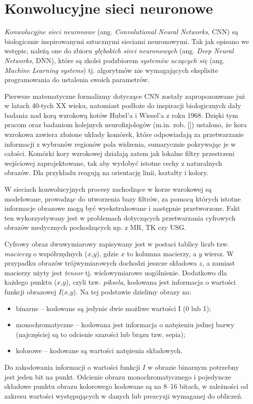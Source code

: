 \chapter{Konwolucyjne sieci neuronowe}
\textit{Konwolucyjne sieci neuronowe} (ang. \textit{Convolutional Neural Networks}, CNN) są biologicznie inspirowanymi sztucznymi sieciami neuronowymi. Tak jak opisano we wstępie, należą one do zbioru \textit{głębokich sieci neuronowych} (ang. \textit{Deep Neural Networks}, DNN), które są zkolei podzbiorem \textit{systemów uczących się} (ang. \textit{Machine Learning systems}) tj. algorytmów nie wymagających eksplisite programowania do ustalenia swoich parametrów.

Pierwsze matematyczne formalizmy dotyczące CNN zostały zapropozonwane już w latach 40-tych XX wieku, natomiast podłoże do inspiracji biologicznych dały badania nad korą wzrokową kotów Hubel'a i Wiesel’a z roku 1968. Dzięki tym pracom oraz badaniom kolejnych neurofizjologów (m.in. zob. []) ustalono, że kora wzrokowa zawiera złożone układy komórek, które odpowiadają za przetwarzanie informacji z wybranów regionów pola widzenia, sumarycznie pokrywając je w całości. Komórki kory wzrokowej działają zatem jak lokalne filtry przestrzeni wejściowej zaprojektowane, tak aby wydobyć istotne cechy z naturalnych obrazów. Dla przykładu reagują na orientację linii, kształty i kolory.

W sieciach konwolucyjnych procesy zachodzące w korze wzrokowej są modelowane, prowadząc do utworzenia bazy filtrów, za pomocą których istotne informacje obrazowe mogą być wyekstrahowane i następnie przetworzone. Fakt ten wykorzystywany jest w problemach dotyczących przetwarzania cyfrowych obrazów medycznych pochodzących np. z MR, TK czy USG.

Cyfrowy obraz dwuwymiarowy zapisywany jest w postaci tablicy liczb tzw. \textit{macierzy} o współrzędnych ($x$,$y$), gdzie $x$ to kolumna macierzy, a $y$ wiersz. W przypadku obrazów trójwymiarowych dochodzi jeszcze składowa $z$, a zamiast macierzy użyty jest \textit{tensor} tj. wielowymiarowe uogólnienie. Dodatkowo dla każdego punktu ($x$,$y$), czyli tzw. \textit{piksela}, kodowana jest informacja o wartości funkcji obrazowej $I$($x$,$y$). Na tej podstawie dzielimy obrazy na:
\begin{itemize}
	\item binarne – kodowane są jedynie dwie możliwe wartości I (0 lub 1);
	\item monochromatyczne – kodowana jest informacja o natężeniu jednej barwy (najczęściej są to odcienie szarości lub brązu tzw. sepia);
	\item kolorowe – kodowane są wartości natężenia składowych.
\end{itemize}
Do zakodowania informacji o wartości funkcji $I$ w obrazie binarnym potrzebny jest jeden bit na punkt. Odcienie obrazu monochromatycznego i pojedyncze składowe punktu obrazu kolorowego kodowane są na 8–16 bitach, w zależności od zakresu wartości występujących w danych lub prezcyzji wymaganej do obliczeń. 

